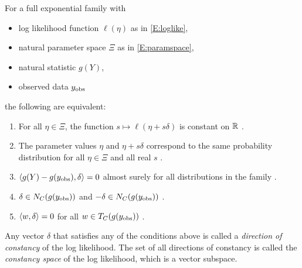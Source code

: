 \begin{theorem} \label{Thm:DOC}
For a full exponential family with
\begin{itemize}
\item log likelihood function $\ell(\eta)$ as in \eqref{E:loglike},
\item natural parameter space $\Xi$ as in \eqref{E:paramspace},
\item natural statistic $g(Y)$,
\item observed data $y_{\text{obs}}$ %
\end{itemize}
the following are equivalent:
\begin{enumerate}
\item For all $\eta \in \Xi$, the function $s \mapsto \ell( \eta + s\delta)$ is 
constant on ${\mathbb R}$ \cite[Theorem 1(b)]{Geyer:gdor}.
\item The parameter values $\eta$ and  $\eta + s\delta$ correspond to the same 
probability distribution for all $\eta \in \Xi$ and all real $s$ \cite[Theorem 1(d)]
{Geyer:gdor}.
\item $\langle g(Y) - g(y_{\text{obs}}),\delta \rangle = 0$ almost surely for all distributions in the 
family \cite[Theorem 1(f)]{Geyer:gdor}.
\item $\delta \in N_C(g(y_{\text{obs}}))$ and $-\delta \in N_C(g(y_{\text{obs}}))$ \cite[Theorem 1(g)]
{Geyer:gdor}.
\item $\langle w,\delta \rangle = 0$ for all $w \in T_C(g(y_{\text{obs}}))$ \cite[Theorem 1(h)]
{Geyer:gdor}.
\end{enumerate}
\end{theorem}
Any vector $\delta$ that satisfies any of the conditions above is called a 
\emph{direction of constancy} of the log likelihood.
The set of all directions of constancy is called the \emph{constancy space} of 
the log likelihood, which is a vector subspace.

